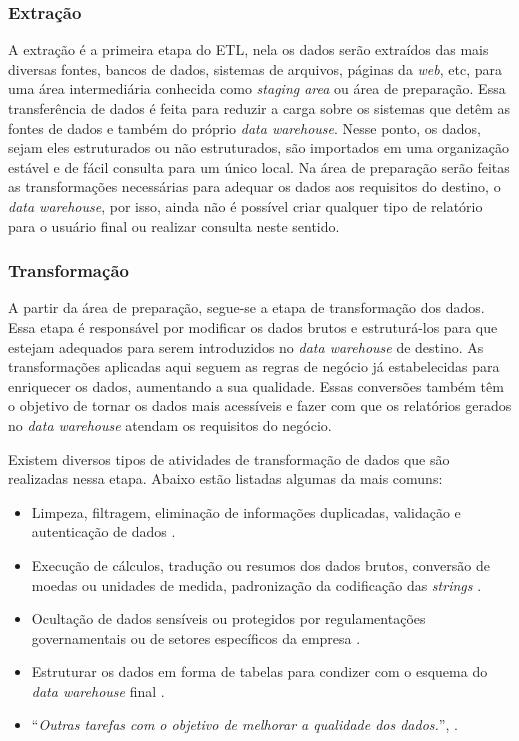 \subsubsection{Extração}
\label{subsec:extracao}
A extração é a primeira etapa do ETL, nela os dados serão extraídos das mais diversas fontes, bancos de dados, sistemas de arquivos, páginas da \textit{web}, etc, para uma área intermediária conhecida como \textit{staging area} ou área de preparação. Essa transferência de dados é feita para reduzir a carga sobre os sistemas que detêm as fontes de dados e também do próprio \textit{data warehouse}. Nesse ponto, os dados, sejam eles estruturados ou não estruturados, são importados em uma organização estável e de fácil consulta para um único local. Na área de preparação serão feitas as transformações necessárias para adequar os dados aos requisitos do destino, o \textit{data warehouse}, por isso, ainda não é possível criar qualquer tipo de relatório para o usuário final ou  realizar consulta neste sentido.

\subsubsection{Transformação}
\label{subsec:transformacao}
A partir da área de preparação, segue-se a etapa de transformação dos dados. Essa etapa é responsável por modificar os dados brutos e estruturá-los para que estejam adequados para serem introduzidos no \textit{data warehouse} de destino. As transformações aplicadas aqui seguem as regras de negócio já estabelecidas para enriquecer os dados, aumentando a sua qualidade. Essas conversões também têm o objetivo de tornar os dados mais acessíveis e fazer com que os relatórios gerados no \textit{data warehouse} atendam os requisitos do negócio.

Existem diversos tipos de atividades de transformação de dados que são realizadas nessa etapa. Abaixo estão listadas algumas da mais comuns:

\begin{itemize}
  \item Limpeza, filtragem, eliminação de informações duplicadas, validação e autenticação de dados \cite{vida2021datawarehouse}.
  \item Execução de cálculos, tradução ou resumos dos dados brutos, conversão de moedas ou unidades de medida, padronização da codificação das \textit{strings} \cite{vida2021datawarehouse}.
  \item Ocultação de dados sensíveis ou protegidos por regulamentações governamentais ou de setores específicos da empresa \cite{vida2021datawarehouse}.
  \item Estruturar os dados em forma de tabelas para condizer com o esquema do \textit{data warehouse} final \cite{vida2021datawarehouse}.
  \item \enquote{\textit{Outras tarefas com o objetivo de melhorar a qualidade dos dados.}}, \cite{vida2021datawarehouse}.
\end{itemize} 

